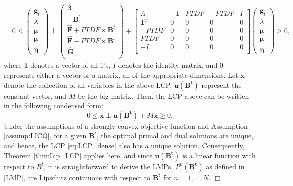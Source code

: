 \documentclass{article}
\theoremstyle{definition}
\theoremstyle{plain}
\begin{document}
\begin{align*}
&0\leq \begin{pmatrix}
\mathbf{g}_t \\
\lambda\\
\bm{\bar{\mu}}\\
\bm{\underline{\mu}}\\
\bm{\bar{\eta}}
\end{pmatrix} \perp 
\begin{pmatrix}
\bm{\beta}\\
- \mathbf{B}^t \\
\bm{\widehat{F}} + PTDF \times \mathbf{B}^t\\
\bm{\widehat{F}} - PTDF \times \mathbf{B}^t\\
\bm{\widehat{G}}\\
\end{pmatrix} + \begin{bmatrix}
\Lambda & - \mathbf{1} & PTDF & - PTDF & I \\
\mathbf{1}^T & 0 & 0 & 0 & 0 \\
-PTDF & 0 & 0 & 0 & 0 \\
PTDF & 0 & 0 & 0 & 0 \\
- I & 0 & 0 & 0 & 0 \\
\end{bmatrix} 
\begin{pmatrix}
\mathbf{g}_t \\
\lambda\\
\bm{\bar{\mu}}\\
\bm{\underline{\mu}}\\
\bm{\bar{\eta}}
\end{pmatrix} \geq 0, 
\end{align*}
where $\mathbf{1}$ denotes a vector of all 1's, $I$ denotes the identity matrix, and $0$ represents either a vector or a matrix, all of the appropriate dimensions. 
Let $\mathbf{x}$ denote the collection of all variables in the above LCP, 
$\mathbf{u(B^t)}$ represent the constant vector, and $M$ be the big matrix.  
Then, the LCP above can be written in the following condensed form:
\begin{equation}\label{eq:LCP_dense}
0 \leq \mathbf{x} \perp \mathbf{u(B^t)} + M\mathbf{x} \geq 0. 
\end{equation}
Under the assumptions of a strongly convex objective function and Assumption \ref{assump:LICQ}, for a given $\mathbf{B}^t$, the optimal primal and dual solutions are unique, and hence, the LCP \eqref{eq:LCP_dense} also has a unique solution. Consequently, Theorem \ref{thm:Lip_LCP} applies here, and since $\mathbf{u(B^t)}$ is a linear function with respect to $B^t$, it is straightforward to derive the LMPs, $P^n(\mathbf{B^t})$ as defined in \eqref{LMP}, are Lipschitz continuous with respect to $\mathbf{B^t}$ for $n = 1, \ldots, N$. 
\hfill$\Box$
\end{document}
